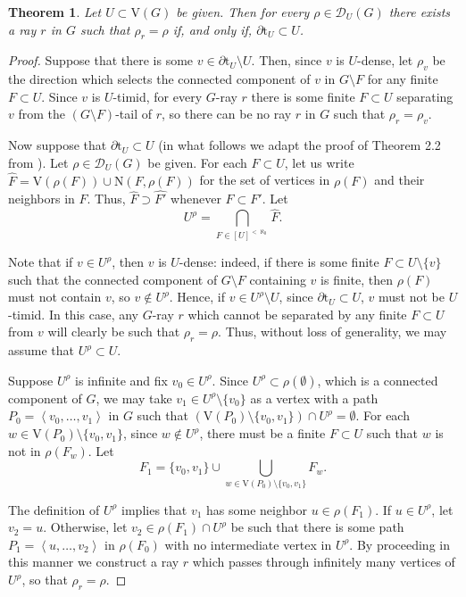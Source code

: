 \documentclass[10pt]{article}
\numberwithin{equation}{subsection}
\newtheorem{theorem}[equation]{Theorem}
\theoremstyle{remark}
\newcommand{\seqq}[1]{{\left\langle {#1} \right\rangle}}
\begin{document}
\begin{theorem}\label{THM_piDSurj}
    Let $U\subset \mathrm{V}(G)$ be given. Then for every $\rho\in \mathcal{D}_U(G)$ there exists a ray $r$ in $G$ such that $\rho_r = \rho$ if, and only if, $\partial \mathrm{t}_U \subset U$.
\end{theorem}
\begin{proof}
    Suppose that there is some $v\in \partial \mathrm{t}_U\setminus U$. Then, since $v$ is $U$-dense, let $\rho_v$ be the direction which selects the connected component of $v$ in $G\setminus F$ for any finite $F\subset U$. Since $v$ is $U$-timid, for every $G$-ray $r$ there is some finite $F\subset U$ separating $v$ from the $(G\setminus F)$-tail of $r$, so there can be no ray $r$ in $G$ such that $\rho_r = \rho_v$.

    Now suppose that $\partial \mathrm{t}_U \subset U$ (in what follows we adapt the proof of Theorem 2.2 from \cite{DIESTEL2003197}). Let $\rho\in \mathcal{D}_U(G)$ be given. For each $F\subset U$, let us write $\hat{F} = \mathrm{V}(\rho(F))\cup \mathrm{N}(F,\rho(F))$ for the set of vertices in $\rho(F)$ and their neighbors in $F$. Thus, $\hat{F}\supset\hat{F'}$ whenever $F\subset F'$. Let
    \[
        U^\rho = \bigcap_{F\in [U]^{<\aleph_0}}\hat{F}.
    \]

    Note that if $v\in U^\rho$, then $v$ is $U$-dense: indeed, if there is some finite $F\subset U\setminus \{v\}$ such that the connected component of $G\setminus F$ containing $v$ is finite, then $\rho(F)$ must not contain $v$, so $v\notin U^\rho$. Hence, if $v\in U^\rho\setminus U$, since $\partial \mathrm{t}_U\subset U$, $v$ must not be $U$-timid. In this case, any $G$-ray $r$ which cannot be separated by any finite $F\subset U$ from $v$ will clearly be such that $\rho_r = \rho$. Thus, without loss of generality, we may assume that $U^\rho\subset U$.
    
    Suppose $U^\rho$ is infinite and fix $v_0\in U^\rho$. Since $U^\rho\subset \rho(\emptyset)$, which is a connected component of $G$, we may take $v_1\in U^\rho\setminus \{v_0\}$ as a vertex with a path $P_0 = \seqq{v_0, \dotsc, v_1}$ in $G$ such that $(\mathrm{V}(P_0)\setminus\{v_0,v_1\})\cap U^\rho = \emptyset$. For each $w\in \mathrm{V}(P_0)\setminus\{v_0,v_1\}$, since $w\notin U^\rho$, there must be a finite $F\subset U$ such that $w$ is not in $\rho(F_w)$. Let 
    \[F_1 = \{v_0,v_1\}\cup \bigcup_{w\in \mathrm{V}(P_0)\setminus\{v_0,v_1\}}F_w.\]
    
    The definition of $U^\rho$ implies that $v_1$ has some neighbor $u\in \rho(F_1)$. If $u\in U^\rho$, let $v_2 = u$. Otherwise, let $v_2\in \rho(F_1)\cap U^\rho$ be such that there is some path $P_1 = \seqq{u, \dotsc, v_2}$ in $\rho(F_0)$ with no intermediate vertex in $U^\rho$. By proceeding in this manner we construct a ray $r$ which passes through infinitely many vertices of $U^\rho$, so that $\rho_r = \rho$.


\end{proof}
\end{document}
